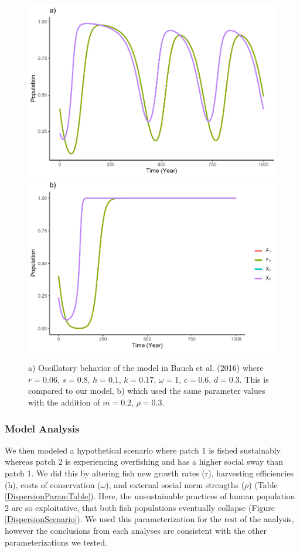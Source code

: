 \documentclass[
  12pt,
]{article}
\begin{document}
\begin{figure}
\includegraphics[width=0.5\linewidth]{Wulfing_Thesis_files/figure-latex/uncoupledFishModel-1} \includegraphics[width=0.5\linewidth]{Wulfing_Thesis_files/figure-latex/uncoupledFishModel-2} \caption{a) Oscillatory behavior of the model in Bauch et al. (2016) where \(r = 0.06\), \(s = 0.8\), \(h = 0.1\), \(k = 0.17\), \(\omega = 1\), \(c = 0.6\), \(d = 0.3\). This is compared to our model, b) which used the same parameter values with the addition of \(m = 0.2\), \(\rho = 0.3\). \label{uncoupledFishModel}}\label{fig:uncoupledFishModel}
\end{figure}

\hypertarget{model-analysis-1}{%
\subsubsection{Model Analysis}\label{model-analysis-1}}

We then modeled a hypothetical scenario where patch 1 is fished sustainably whereas patch 2 is experiencing overfishing and has a higher social sway than patch 1. We did this by altering fish new growth rates (r), harvesting efficiencies (h), costs of conservation (\(\omega\)), and external social norm strengths (\(\rho\)) (Table \ref{DispersionParamTable}). Here, the unsustainable practices of human population 2 are so exploitative, that both fish populations eventually collapse (Figure \ref{DispersionScenario}). We used this parameterization for the rest of the analysis, however the conclusions from each analyses are consistent with the other parameterizations we tested.
\end{document}
